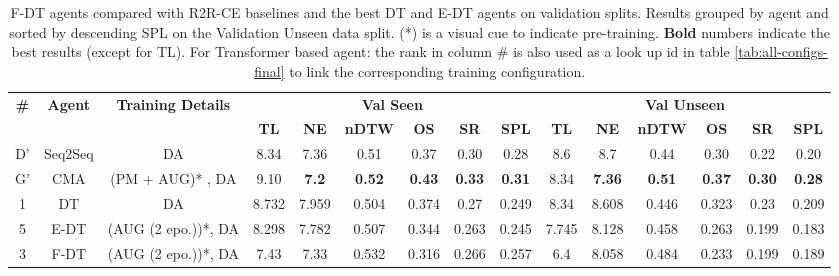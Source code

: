\begin{table}
\centering
\caption{\label{tab:f_dt_final}F-DT agents compared with R2R-CE baselines and the best DT and E-DT agents on validation splits. Results grouped by agent and sorted by descending SPL on the Validation Unseen data split. (*) is a visual
cue to indicate pre-training.  \textbf{Bold} numbers indicate the best results (except for TL). For Transformer based agent: the rank in column \# is also used as a look up id in table \ref{tab:all-configs-final} to link the corresponding training configuration.}
\begin{tabular}{@{\hskip3pt}c@{\hskip3pt}c@{\hskip3pt}c@{\hskip3pt}c@{\hskip3pt}c@{\hskip3pt}c@{\hskip3pt}c@{\hskip3pt}c@{\hskip3pt}c@{\hskip3pt}c@{\hskip3pt}c@{\hskip3pt}c@{\hskip3pt}c@{\hskip3pt}c@{\hskip3pt}c}
\toprule
\textbf{\#} & \textbf{Agent} & \textbf{Training Details} & \multicolumn{6}{c}{\textbf{Val Seen}} & \multicolumn{6}{c}{\textbf{Val Unseen}} \\
\cmidrule(l){4-9}\cmidrule(l){10-15} \textbf{~} &     \textbf{~} &                \textbf{~} &       \textbf{TL} &    \textbf{NE} &   \textbf{nDTW} &     \textbf{OS} &     \textbf{SR} &    \textbf{SPL} &         \textbf{TL} &     \textbf{NE} &   \textbf{nDTW} &     \textbf{OS} &    \textbf{SR} &    \textbf{SPL} \\
\midrule
          D' & Seq2Seq & DA & 8.34 & 7.36 & 0.51 & 0.37 & 0.30 & 0.28 & 8.6 & 8.7 & 0.44 & 0.30 & 0.22 & 0.20 \\
          \midrule
          G' & CMA & (PM + AUG)* , DA  & 9.10 & \textbf{7.2} & \textbf{0.52} & \textbf{0.43} & \textbf{0.33} & \textbf{0.31} & 8.34 & \textbf{7.36} & \textbf{0.51} & \textbf{0.37} & \textbf{0.30} & \textbf{0.28} \\
          \midrule
          1 &             DT &                  DA &             8.732 &          7.959 &           0.504 &  0.374 &            0.27 &           0.249 &                8.34 &           8.608 &           0.446 &  0.323 &  0.23 &  0.209 \\
         \midrule
          5 &           E-DT &  (AUG (2 epo.))*, DA &             8.298 &          7.782 &           0.507 &           0.344 &           0.263 &           0.245 &               7.745 &           8.128 &           0.458 &           0.263 &          0.199 &           0.183 \\
          \midrule
          3 &           F-DT &  (AUG (2 epo.))*, DA &              7.43 &  7.33 &  0.532 &           0.316 &           0.266 &  0.257 &                 6.4 &  8.058 &  0.484 &           0.233 &          0.199 &           0.189 \\

\end{tabular}
\end{table}
